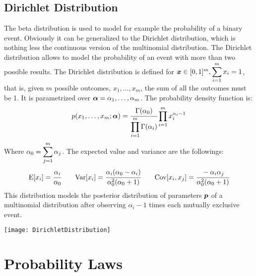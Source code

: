 \subsection{Dirichlet Distribution}
The beta distribution is used to model for example the probability of a binary event. Obviously it can be generalized to the Dirichlet distribution, which is nothing less the continuous version of the multinomial distribution. The Dirichlet distribution allows to model the probability of an event with more than two possible results.\newline
The Dirichlet distribution is defined for $\bm{x}\in[0,1]^m, \displaystyle\sum_{i=1}^m x_i=1$, that is, given $m$ possible outcomes, $x_1, \hdots, x_m$, the sum of all the outcomes must be 1. \newline
It is parametrized over $\bm{\alpha}=\alpha_1, \hdots, \alpha_m$.\newline
The probability density function is:
\begin{equation}
	p(x_1,\hdots,x_m;\bm{\alpha})=\cfrac{\Gamma(\alpha_0)}{\displaystyle\prod_{i=1}^m\Gamma(\alpha_i)}\displaystyle\prod_{i=1}^mx_i^{\alpha_i-1}
	\label{eq:DirichletDensity}
\end{equation}
Where $\alpha_0=\displaystyle\sum_{j=1}^m\alpha_j$. 
The expected value and variance are the followings:
\begin{equation}
	\text{E}[x_i]=\cfrac{\alpha_i}{\alpha_0}\qquad \text{Var}[x_i]=\cfrac{\alpha_i(\alpha_0-\alpha_i)}{\alpha_0^2(\alpha_0+1)}\qquad\text{Cov}[x_i,x_j]=\cfrac{-\alpha_i\alpha_j}{\alpha_0^2(\alpha_0+1)}
	\label{eq:DirichletStatistics}
\end{equation}
This distribution models the posterior distribution of parameters $\bm{p}$ of a multinomial distribution after observing $\alpha_i-1$ times each mutually exclusive event. 
\begin{center}
	\texttt{[image: DirichletDistribution]}
\end{center}
%
%
%
\section{Probability Laws}
%
%
